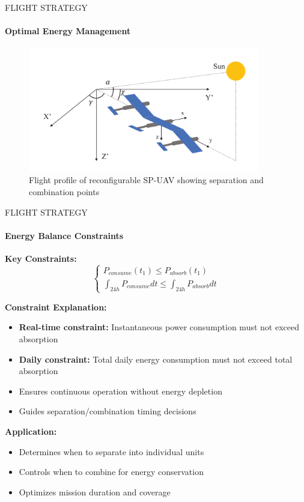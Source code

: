 \documentclass{beamer}
\begin{document}
\begin{frame}{FLIGHT STRATEGY}
    \framesubtitle{Optimal Energy Management}
    
    \begin{figure}
        \centering
        \includegraphics[width=0.9\textwidth]{flight_strategy.png}
        \caption{Flight profile of reconfigurable SP-UAV showing separation and combination points}
        \label{fig:flight_strategy}
    \end{figure}
\end{frame}

\begin{frame}{FLIGHT STRATEGY}
    \framesubtitle{Energy Balance Constraints}
    
    \textbf{Key Constraints:}
    \begin{equation*}
        \begin{cases}
            P_{consume}(t_1) \leq P_{absorb}(t_1) \\
            \int_{24h} P_{consume}dt \leq \int_{24h} P_{absorb}dt
        \end{cases}
    \end{equation*}
    
    \vspace{0.5cm}
    \textbf{Constraint Explanation:}
    \begin{itemize}
        \item \textbf{Real-time constraint:} Instantaneous power consumption must not exceed absorption
        \item \textbf{Daily constraint:} Total daily energy consumption must not exceed total absorption
        \item Ensures continuous operation without energy depletion
        \item Guides separation/combination timing decisions
    \end{itemize}
    
    \vspace{0.3cm}
    \textbf{Application:}
    \begin{itemize}
        \item Determines when to separate into individual units
        \item Controls when to combine for energy conservation
        \item Optimizes mission duration and coverage
    \end{itemize}
\end{frame}
\end{document}
